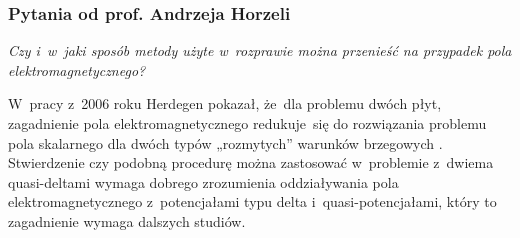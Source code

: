 \documentclass[10pt,t]{beamer}
\begin{document}
\begin{frame}
  \frametitle{Pytania od prof. Andrzeja Horzeli}


  \textit{Czy i~w~jaki sposób metody użyte w~rozprawie można przenieść
    na przypadek pola elektromagnetycznego?}

  W~pracy z~2006 roku Herdegen pokazał, że~dla problemu dwóch płyt,
  zagadnienie pola elektromagnetycznego redukuje~się do rozwiązania problemu
  pola skalarnego dla dwóch typów „rozmytych” warunków brzegowych
  \parencite{Herdegen-Quantum-backreaction-ETC-Part-II-Pub-2006}.
  Stwierdzenie czy podobną procedurę można zastosować w~problemie z~dwiema
  quasi-deltami wymaga dobrego zrozumienia oddziaływania pola
  elektromagnetycznego z~potencjałami typu delta i~quasi-potencjałami,
  który to zagadnienie wymaga dalszych studiów.

\end{frame}



































\printbibliography





\end{document}
